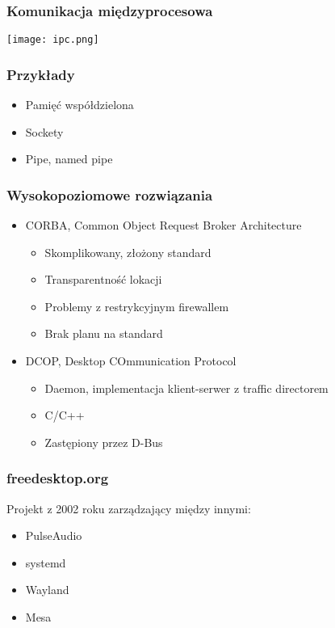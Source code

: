 

\begin{frame}
\frametitle{Komunikacja międzyprocesowa}
\texttt{[image: ipc.png]}
\end{frame}

\begin{frame}
    \frametitle{Przykłady}
        \begin{itemize}
        \item Pamięć współdzielona
        \item Sockety
        \item Pipe, named pipe
    \end{itemize}
\end{frame}

\begin{frame}
    \frametitle{Wysokopoziomowe rozwiązania}
    \begin{itemize}
        \item CORBA, Common Object Request Broker Architecture
        \begin{itemize}
            \item Skomplikowany, złożony standard
            \item Transparentność lokacji
            \item Problemy z restrykcyjnym firewallem
            \item Brak planu na standard\pause
        \end{itemize}


        \item DCOP, Desktop COmmunication Protocol
        \begin{itemize}
            \item Daemon, implementacja klient-serwer z traffic directorem
            \item C/C++
            \item Zastępiony przez D-Bus
        \end{itemize}
    \end{itemize}

\end{frame}


\begin{frame}
    \frametitle{freedesktop.org}
    Projekt z 2002 roku zarządzający między innymi:
    \begin{itemize}
        \item PulseAudio
        \item systemd
        \item Wayland
        \item Mesa
    \end{itemize}

\end{frame}


